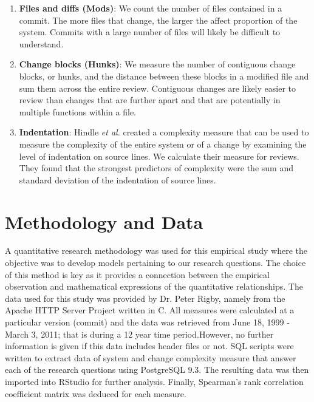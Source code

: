 \documentclass[9pt,twocolumn,a4paper]{article}
\begin{document}
\begin{enumerate}

\item{\bf{Files and diffs (Mods)}}: We count the number of files contained in a commit. The more files that change, the larger the affect proportion of the system. Commits with a large number of files will likely be difficult to understand.

\item{\bf{Change blocks (Hunks)}}: We measure the number of contiguous change blocks, or hunks, and the distance between these blocks in a modified file and sum them across the entire review. Contiguous changes are likely easier to review than changes that are further apart and that are potentially in multiple functions within a file.

\item{\bf{Indentation}}: Hindle {\em {et al.}} \cite{Hindle} created a complexity measure that can be used to measure the complexity of the entire system or of a change by examining the level of indentation on source lines. We calculate their measure for reviews. They found that the strongest predictors of complexity were the sum and standard deviation of the indentation of source lines.

\end{enumerate}



\section{Methodology and Data}

A quantitative research methodology was used for this empirical study where the objective was to develop models pertaining to our research questions. The choice of this method is key as it provides a connection between the empirical observation and mathematical expressions of the quantitative relationships. 
The data used for this study was provided by Dr. Peter Rigby, namely from the Apache HTTP Server Project written in C. All measures were calculated at a particular version (commit) and the data was retrieved from June 18, 1999 - March 3, 2011; that is during a 12 year time period.However, no further information is given if this data includes header files or not. SQL scripts were written to extract data of system and change complexity measure that answer each of the research questions using PostgreSQL 9.3. The resulting data was then imported into RStudio for further analysis. Finally, Spearman's rank correlation coefficient matrix was deduced for each measure. 
\end{document}
